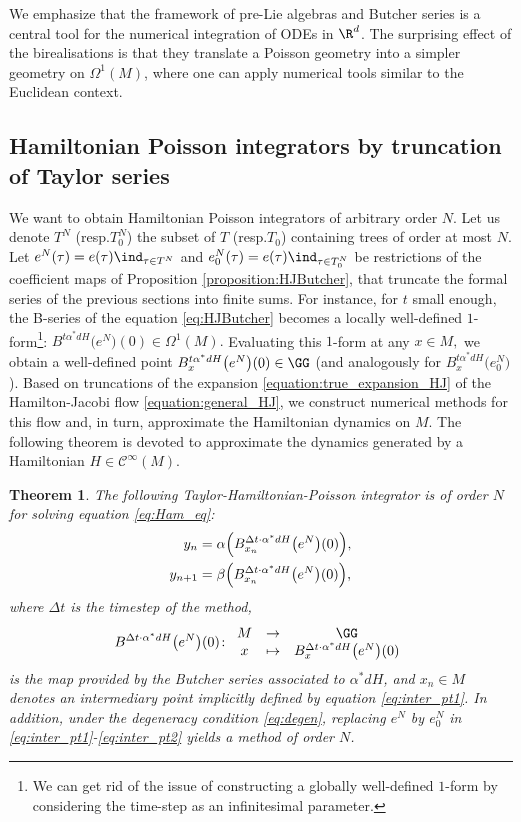 \documentclass[a4paper,11pt]{article}
\newcommand{\func}[1]{\mathcal{C}^{\infty}(#1)}
\newtheorem{theorem}{Theorem}[section]
\def\ts{\thinspace}
\begin{document}
We emphasize that the framework of pre-Lie algebras and Butcher series is a central tool for the numerical integration of ODEs in $\R^d$. The surprising effect of the birealisations is that they translate a Poisson geometry into a simpler geometry on $\Omega^1(M)$, where one can apply numerical tools similar to the Euclidean context.

\subsection{Hamiltonian Poisson integrators by truncation of Taylor series}

We want to obtain Hamiltonian Poisson integrators of arbitrary order $N.$ Let us denote $T^N$ (resp.\ts $T_0^N$) the subset of $T$ (resp.\ts $T_0$) containing trees of order at most $N$. Let $e^N(\tau)=e(\tau)\ind_{\tau\in T^N}$ and $e_0^N(\tau)=e(\tau)\ind_{\tau\in T_0^N}$ be restrictions of the coefficient maps of Proposition \ref{proposition:HJButcher}, that truncate the formal series of the previous sections into finite sums.
For instance, for $t$ small enough, the B-series of the equation \eqref{eq:HJButcher} becomes a locally well-defined $1$-form\footnote{We can get rid of the issue of constructing a globally well-defined $1$-form by considering the time-step as an infinitesimal parameter.}: $B^{t\alpha^* dH}\bigl( e^N \bigr) (0) \in \Omega^1(M).$ Evaluating this $1$-form at any $x \in M,$ we obtain a well-defined point $B^{t\alpha^* dH}_{x}\bigl( e^N \bigr) (0) \in \GG$ (and analogously for $B^{t\alpha^* dH}_{x}\bigl( e_0^N \bigr)$). Based on truncations of the expansion \eqref{equation:true_expansion_HJ} of the Hamilton-Jacobi flow \eqref{equation:general_HJ}, we construct numerical methods for this flow and, in turn, approximate the Hamiltonian dynamics on $M$. The following theorem is devoted to approximate the dynamics generated by a Hamiltonian $H \in \func{M}.$

\begin{theorem}
\label{thm:THP}
The following Taylor-Hamiltonian-Poisson integrator is of order $N$ for solving equation \eqref{eq:Ham_eq}:
\begin{align}
\label{eq:inter_pt1}
y_n&=\alpha\Bigl(B_{x_n}^{\Delta t \cdot  \alpha^* dH}\bigl(e^N\bigr)(0)\Bigr),\\
\label{eq:inter_pt2}
y_{n+1}&=\beta\Bigl(B_{x_n}^{\Delta t \cdot  \alpha^* dH}\bigl(e^N\bigr)(0)\Bigr),
\end{align} 
where $\Delta t$ is the timestep of the method,
\[
B^{\Delta t \cdot  \alpha^* dH}\bigl(e^N\bigr)(0) \colon 
\begin{array}{ccc} 
M & \to & \GG \\
x & \mapsto & B_{x}^{\Delta t \cdot  \alpha^* dH}\bigl(e^N\bigr)(0)
\end{array}
\]
is the map provided by the Butcher series associated to $\alpha^* dH$, and $x_n \in M$ denotes an intermediary point implicitly defined by equation \eqref{eq:inter_pt1}.
In addition, under the degeneracy condition \eqref{eq:degen}, replacing $e^N$ by $e_0^N$ in \eqref{eq:inter_pt1}-\eqref{eq:inter_pt2} yields a method of order $N$.
\end{theorem}
\end{document}
